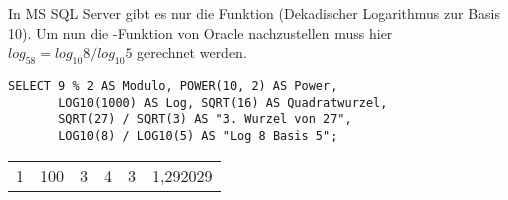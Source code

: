 In MS SQL Server gibt es nur die Funktion 
(Dekadischer Logarithmus zur Basis 10). Um nun die
-Funktion von Oracle nachzustellen muss hier $log_58
    = log_{10}8 / log_{10}5$ gerechnet werden.
\begin{lstlisting}[language=ms_sql,caption={Höhere Rechenarten in MS SQL Server},label=sql03_18]
SELECT 9 % 2 AS Modulo, POWER(10, 2) AS Power,
       LOG10(1000) AS Log, SQRT(16) AS Quadratwurzel,
       SQRT(27) / SQRT(3) AS "3. Wurzel von 27",
       LOG10(8) / LOG10(5) AS "Log 8 Basis 5";
        \end{lstlisting}
\begin{center}
    \begin{small}
        \tablehead{}
        \begin{mssql}
            \begin{supertabular}{llllll}
                1 & 100 & 3 & 4 & 3 & 1,292029 \\
            \end{supertabular}
        \end{mssql}
    \end{small}
\end{center}
\clearpage
\begin{literaturinternet}
    \item \cite{i97801}
    \item \cite{i77449}
    \item \cite{i84140}
    \item \cite{i77996}
    \item \cite{i78493}
    \item \cite{i78633}
    \item \cite{ms189818}
    \item \cite{ms178531}
    \item \cite{ms175121}
    \item \cite{ms174276}
    \item \cite{ms175003}
\end{literaturinternet}
